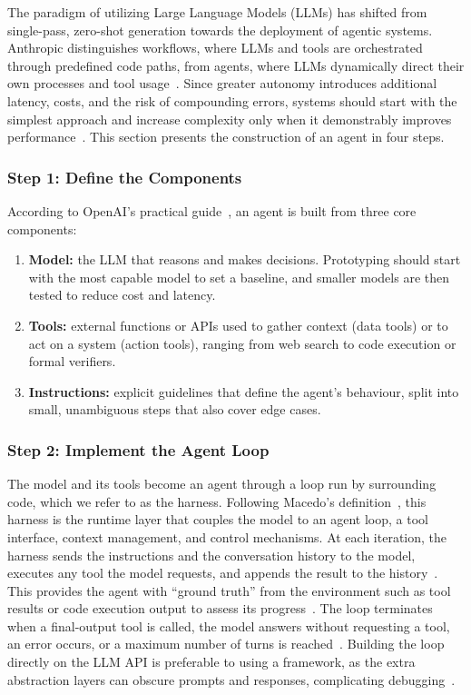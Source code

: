 The paradigm of utilizing Large Language Models (LLMs) has shifted from single-pass, zero-shot generation towards the deployment of agentic systems. Anthropic distinguishes workflows, where LLMs and tools are orchestrated through predefined code paths, from agents, where LLMs dynamically direct their own processes and tool usage~\cite{anthropic2024building}. Since greater autonomy introduces additional latency, costs, and the risk of compounding errors, systems should start with the simplest approach and increase complexity only when it demonstrably improves performance~\cite{anthropic2024building,openai2025practical}. This section presents the construction of an agent in four steps.
 
\subsubsection{Step 1: Define the Components}
According to OpenAI's practical guide~\cite{openai2025practical}, an agent is built from three core components:
\begin{enumerate}
    \item \textbf{Model:} the LLM that reasons and makes decisions. Prototyping should start with the most capable model to set a baseline, and smaller models are then tested to reduce cost and latency.
    \item \textbf{Tools:} external functions or APIs used to gather context (data tools) or to act on a system (action tools), ranging from web search to code execution or formal verifiers.
    \item \textbf{Instructions:} explicit guidelines that define the agent's behaviour, split into small, unambiguous steps that also cover edge cases.
\end{enumerate}
 
\subsubsection{Step 2: Implement the Agent Loop}
The model and its tools become an agent through a loop run by surrounding code, which we refer to as the harness. Following Macedo's definition~\cite{macedo2026harness}, this harness is the runtime layer that couples the model to an agent loop, a tool interface, context management, and control mechanisms. At each iteration, the harness sends the instructions and the conversation history to the model, executes any tool the model requests, and appends the result to the history~\cite{openai2025practical}. This provides the agent with ``ground truth'' from the environment such as tool results or code execution output to assess its progress~\cite{anthropic2024building}. The loop terminates when a final-output tool is called, the model answers without requesting a tool, an error occurs, or a maximum number of turns is reached~\cite{openai2025practical}. Building the loop directly on the LLM API is preferable to using a framework, as the extra abstraction layers can obscure prompts and responses, complicating debugging~\cite{anthropic2024building}.
 
